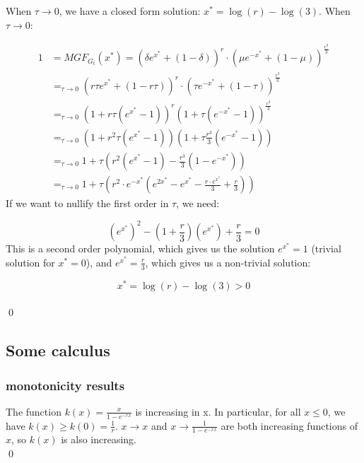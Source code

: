 \begin{proposition} \label{cl:MGFtau0} 
When $\tau \to 0$, we have a closed form solution: $x^* = \log(r) - \log(3)$.
\proof When $\tau \to 0$:

\begin{align*}
1 &= MGF_{G_t}(x^*) = (\delta e^{x^*} + (1 - \delta))^r\cdot (\mu e^{-x^*} + (1 - \mu))^\frac{r^3}{3} \\
&=_{\tau \to 0} (r\tau e^{x^*} + (1 - r\tau))^r\cdot (\tau e^{-x^*} + (1 - \tau))^\frac{r^3}{3} \\
&=_{\tau \to 0} (1 + r\tau (e^{x^*} - 1))^r (1 + \tau(e^{-x^*} - 1))^\frac{r^3}{3} \\
&=_{\tau \to 0} (1 + r^2\tau (e^{x^*} - 1)) (1 + \tau \frac{r^3}{3} (e^{-x^*} - 1)) \\
&=_{\tau \to 0} 1 + \tau \left( r^2(e^{x^*} - 1) - \frac{r^3}{3} (1 - e^{-x^*}) \right) \\
&=_{\tau \to 0} 1 + \tau \left( r^2 \cdot e^{-x^*}(e^{2x^*} - e^{x^*} - \frac{r\cdot e^{x^*}}{3}  + \frac{r}{3}) \right)
\end{align*}
If we want to nullify the first order in $\tau$, we need:

$$  (e^{x^*})^2  - (1 + \frac{r}{3}) (e^{x^*}) + \frac{r}{3} = 0 $$
This is a second order polynomial, which gives us the solution $e^{x^*} = 1$ (trivial solution for $x^* = 0$), and $e^{x^*} = \frac{r}{3}$, which gives us a non-trivial solution:

$$x^* = \log(r) - \log(3) > 0 $$ \\\qed 
\end{proposition}





\subsection{Some calculus}
\subsubsection{monotonicity results}

\begin{proposition} \label{cl:taudelta} 
The function $k(x) = \frac{x}{1-e^{-rx}}$ is increasing in x. In particular, for all $x \leq 0$, we have $k(x) \geq k(0) = \frac{1}{r}$.
\proof $x \to x$ and $x \to \frac{1}{1-e^{-rx}}$ are both increasing functions of $x$, so $k(x)$ is also increasing. \\\qed 
\end{proposition}

